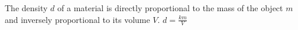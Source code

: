 {The density $d$ of a material is directly proportional to the mass of the object $m$ and inversely proportional to its volume $V$.}
{$d=\frac{km}{V}$}